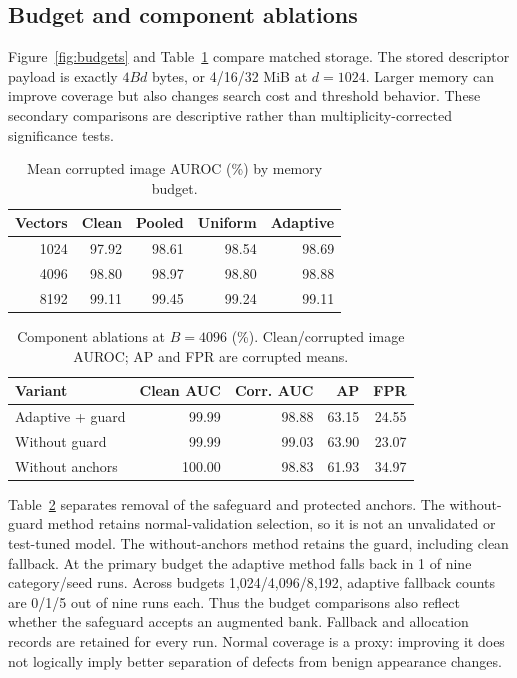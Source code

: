 \documentclass[10pt,twocolumn,letterpaper]{article}
\begin{document}
\subsection{Budget and component ablations}
Figure~\ref{fig:budgets} and Table~\ref{tab:budget} compare matched storage. The stored descriptor payload is exactly $4Bd$ bytes, or 4/16/32 MiB at $d=1024$. Larger memory can improve coverage but also changes search cost and threshold behavior. These secondary comparisons are descriptive rather than multiplicity-corrected significance tests.
\begin{table}[t]
\centering\small
\caption{Mean corrupted image AUROC (\%) by memory budget.}
\label{tab:budget}
\begin{tabular}{rrrrr}\toprule
Vectors & Clean & Pooled & Uniform & Adaptive\\\midrule
1024 & 97.92 & 98.61 & 98.54 & 98.69 \\
4096 & 98.80 & 98.97 & 98.80 & 98.88 \\
8192 & 99.11 & 99.45 & 99.24 & 99.11 \\
\bottomrule\end{tabular}
\end{table}

\begin{table}[t]
\centering\small
\caption{Component ablations at $B=4096$ (\%). Clean/corrupted image AUROC; AP and FPR are corrupted means.}
\label{tab:ablations}
\setlength{\tabcolsep}{3pt}
\begin{tabular}{lrrrr}\toprule
Variant & Clean AUC & Corr. AUC & AP & FPR\\\midrule
Adaptive + guard & 99.99 & 98.88 & 63.15 & 24.55 \\
Without guard & 99.99 & 99.03 & 63.90 & 23.07 \\
Without anchors & 100.00 & 98.83 & 61.93 & 34.97 \\
\bottomrule\end{tabular}
\end{table}

Table~\ref{tab:ablations} separates removal of the safeguard and protected anchors. The without-guard method retains normal-validation selection, so it is not an unvalidated or test-tuned model. The without-anchors method retains the guard, including clean fallback. At the primary budget the adaptive method falls back in 1 of nine category/seed runs. Across budgets 1,024/4,096/8,192, adaptive fallback counts are 0/1/5 out of nine runs each. Thus the budget comparisons also reflect whether the safeguard accepts an augmented bank. Fallback and allocation records are retained for every run. Normal coverage is a proxy: improving it does not logically imply better separation of defects from benign appearance changes.
\end{document}

